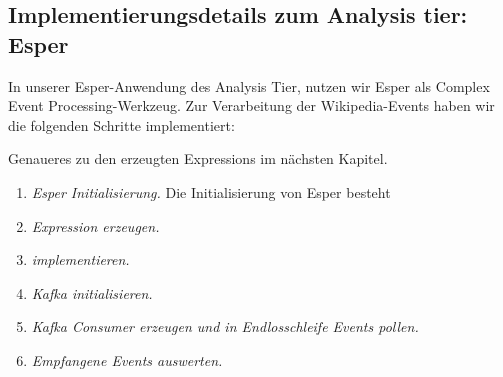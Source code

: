 \subsection{Implementierungsdetails zum Analysis tier: Esper}
In unserer Esper-Anwendung des Analysis Tier, nutzen wir Esper als Complex Event Processing-Werkzeug. Zur Verarbeitung
der Wikipedia-Events haben wir die folgenden Schritte implementiert:

Genaueres zu den erzeugten Expressions im nächsten Kapitel.

\begin{enumerate}
    \item \textit{Esper Initialisierung.} Die Initialisierung von Esper besteht
    \item \textit{Expression erzeugen.}
    \item \textit{ implementieren.}
    \item \textit{Kafka initialisieren.}
    \item \textit{Kafka Consumer erzeugen und in Endlosschleife Events pollen.}
    \item \textit{Empfangene Events auswerten.}
\end{enumerate}